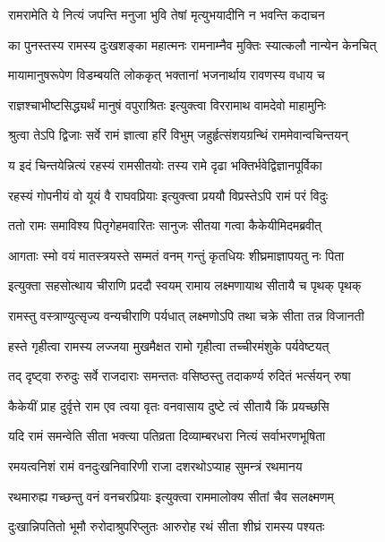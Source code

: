 \twolineshloka
{रामरामेति ये नित्यं जपन्ति मनुजा भुवि}
{तेषां मृत्युभयादीनि न भवन्ति कदाचन} %

\twolineshloka
{का पुनस्तस्य रामस्य दुःखशङ्का महात्मनः}
{रामनाम्नैव मुक्तिः स्यात्कलौ नान्येन केनचित्} %

\twolineshloka
{मायामानुषरूपेण विडम्बयति लोककृत्}
{भक्तानां भजनार्थाय रावणस्य वधाय च} %

\twolineshloka
{राज्ञश्चाभीष्टसिद्ध्यर्थं मानुषं वपुराश्रितः}
{इत्युक्त्वा विररामाथ वामदेवो माहामुनिः} %

\twolineshloka
{श्रुत्वा तेऽपि द्विजाः सर्वे रामं ज्ञात्वा हरिं विभुम्}
{जहुर्हृत्संशयग्रन्थिं राममेवान्वचिन्तयन्} %

\twolineshloka
{य इदं चिन्तयेन्नित्यं रहस्यं रामसीतयोः}
{तस्य रामे दृढा भक्तिर्भवेद्विज्ञानपूर्विका} %

\twolineshloka
{रहस्यं गोपनीयं वो यूयं वै राघवप्रियाः}
{इत्युक्त्वा प्रययौ विप्रस्तेऽपि रामं परं विदुः} %

\twolineshloka
{ततो रामः समाविश्य पितृगेहमवारितः}
{सानुजः सीतया गत्वा कैकेयीमिदमब्रवीत्} %

\twolineshloka
{आगताः स्मो वयं मातस्त्रयस्ते सम्मतं वनम्}
{गन्तुं कृतधियः शीघ्रमाज्ञापयतु नः पिता} %

\twolineshloka
{इत्युक्ता सहसोत्थाय चीराणि प्रददौ स्वयम्}
{रामाय लक्ष्मणायाथ सीतायै च पृथक् पृथक्} %

\twolineshloka
{रामस्तु वस्त्राण्युत्सृज्य वन्यचीराणि पर्यधात्}
{लक्ष्मणोऽपि तथा चक्रे सीता तन्न विजानती} %

\twolineshloka
{हस्ते गृहीत्वा रामस्य लज्जया मुखमैक्षत}
{रामो गृहीत्वा तच्चीरमंशुके पर्यवेष्टयत्} %

\twolineshloka
{तद् दृष्ट्वा रुरुदुः सर्वे राजदाराः समन्ततः}
{वसिष्ठस्तु तदाकर्ण्य रुदितं भर्त्सयन् रुषा} %

\twolineshloka
{कैकेयीं प्राह दुर्वृत्ते राम एव त्वया वृतः}
{वनवासाय दुष्टे त्वं सीतायै किं प्रयच्छसि} %

\twolineshloka
{यदि रामं समन्वेति सीता भक्त्या पतिव्रता}
{दिव्याम्बरधरा नित्यं सर्वाभरणभूषिता} %

\twolineshloka
{रमयत्वनिशं रामं वनदुःखनिवारिणी}
{राजा दशरथोऽप्याह सुमन्त्रं रथमानय} %

\twolineshloka
{रथमारुह्य गच्छन्तु वनं वनचरप्रियाः}
{इत्युक्त्वा राममालोक्य सीतां चैव सलक्ष्मणम्} %

\twolineshloka
{दुःखान्निपतितो भूमौ रुरोदाश्रुपरिप्लुतः}
{आरुरोह रथं सीता शीघ्रं रामस्य पश्यतः} %

